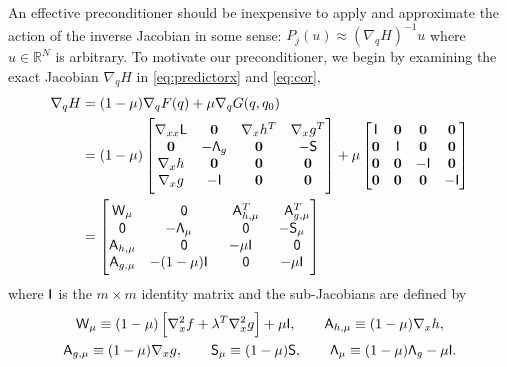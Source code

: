 An effective preconditioner should be inexpensive to apply and approximate the
action of the inverse Jacobian in some sense: $P_j(u) \approx (\nabla_q H)^{-1}
u$ where $u \in \mathbb{R}^{N}$ is arbitrary.  To motivate our preconditioner,
we begin by examining the exact Jacobian $\nabla_q H$ in  \eqref{eq:predictorx} and \eqref{eq:cor}, 
\begin{equation}\label{eq:dHdq}
\begin{aligned}
\nabla_q H &= (1 - \mu) \nabla_{q} F(q) + \mu \nabla_q G(q,q_0) \\
&=  (1-\mu)\begin{bmatrix}
 \nabla_{xx} \mathsf{L}   & \boldsymbol{0} & \nabla_x h^T   &  \nabla_x g^T   \\   %
\boldsymbol{0}     &   - \mat{\Lambda}_g   & \boldsymbol{0} & -\mathsf{S}     \\
\nabla_x h &  \boldsymbol{0}   & \boldsymbol{0} &  \boldsymbol{0}  \\
\nabla_x g  & -\mathsf{I}  &  \boldsymbol{0}  & \boldsymbol{0}   \\
\end{bmatrix}
+ \mu \begin{bmatrix}
\mathsf{I} & \boldsymbol{0} & \boldsymbol{0} & \boldsymbol{0} \\
\boldsymbol{0}  & \mathsf{I}  & \boldsymbol{0} & \boldsymbol{0} \\
\boldsymbol{0} & \boldsymbol{0} & -\mathsf{I} &  \boldsymbol{0} \\
\boldsymbol{0} & \boldsymbol{0} &   \boldsymbol{0} & -\mathsf{I} 
\end{bmatrix} \\
& = \begin{bmatrix}
	\mat{W}_\mu & \phantom{-}\mat{0} & \phantom{-}\mat{A}_{h,\mu}^T  & \phantom{-}\mat{A}_{g,\mu}^T \\
	\mat{0}  & -\mat{\Lambda}_\mu & \phantom{-}\mat{0}   & -\mat{S}_\mu \\
	\mat{A}_{h, \mu} & \phantom{-}\mat{0} &  -\mu \mat{I} & \phantom{-}\mat{0}  \\
	\mat{A}_{g, \mu} & -(1-\mu)\mat{I} &  \phantom{-}\mat{0}     &   -\mu \mat{I}
\end{bmatrix}
\end{aligned}
\end{equation}
where $\mathsf{I}$ is the $m\times m$ identity matrix and the sub-Jacobians are
defined by
\begin{gather*}
	\mathsf{W}_{\mu} \equiv (1-\mu) \left[\nabla_x^2 f + \lambda^T \nabla_x^2 g\right] + \mu \mathsf{I},\qquad
	\mathsf{A}_{h, \mu} \equiv (1-\mu) \nabla_x h, \\
	\mathsf{A}_{g, \mu} \equiv (1-\mu) \nabla_x g, \qquad 
	\mathsf{S}_{\mu} \equiv (1-\mu)\mathsf{S},\qquad
	\mathsf{\Lambda}_\mu \equiv (1-\mu)  \mathsf{\Lambda}_g - \mu \mathsf{I}. 
\end{gather*}

